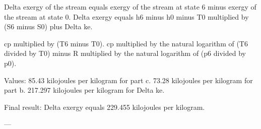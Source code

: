 Delta exergy of the stream equals exergy of the stream at state 6 minus exergy of the stream at state 0.  
Delta exergy equals h6 minus h0 minus T0 multiplied by (S6 minus S0) plus Delta ke.  

cp multiplied by (T6 minus T0).  
cp multiplied by the natural logarithm of (T6 divided by T0) minus R multiplied by the natural logarithm of (p6 divided by p0).  

Values:  
85.43 kilojoules per kilogram for part c.  
73.28 kilojoules per kilogram for part b.  
217.297 kilojoules per kilogram for Delta ke.  

Final result:  
Delta exergy equals 229.455 kilojoules per kilogram.

---